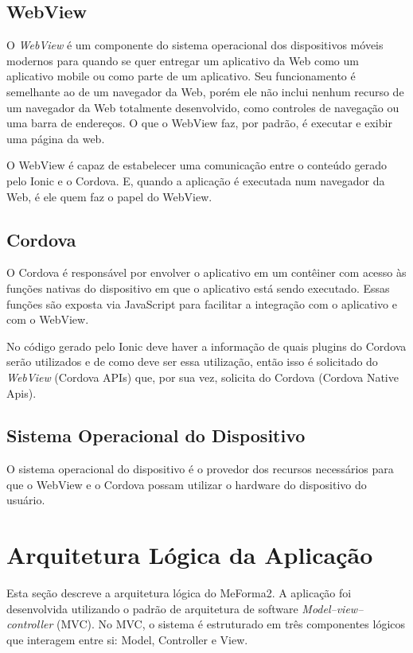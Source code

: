\subsection{WebView}

O \textit{WebView} é um componente do sistema operacional dos dispositivos móveis modernos para quando se quer entregar um aplicativo da Web como um aplicativo mobile ou como parte de um aplicativo. Seu funcionamento é semelhante ao de um navegador da Web, porém ele não inclui nenhum recurso de um navegador da Web totalmente desenvolvido, como controles de navegação ou uma barra de endereços. O que o WebView faz, por padrão, é executar e exibir uma página da web.

O WebView é capaz de estabelecer uma comunicação entre o conteúdo gerado pelo Ionic e o Cordova. E, quando a aplicação é executada num navegador da Web, é ele quem faz o papel do WebView.

\subsection{Cordova}

O Cordova é responsável por envolver o aplicativo em um contêiner com acesso às funções nativas do dispositivo em que o aplicativo está sendo executado. Essas funções são exposta via JavaScript para facilitar a integração com o aplicativo e com o WebView.

No código gerado pelo Ionic deve haver a informação de quais plugins do Cordova serão utilizados e de como deve ser essa utilização, então isso é solicitado do \textit{WebView} (Cordova APIs) que, por sua vez, solicita do Cordova (Cordova Native Apis).

\subsection{Sistema Operacional do Dispositivo}

O sistema operacional do dispositivo é o provedor dos recursos necessários para que o WebView e o Cordova possam utilizar o hardware do dispositivo do usuário.

\section{Arquitetura Lógica da Aplicação}

Esta seção descreve a arquitetura lógica do MeForma2. A aplicação foi desenvolvida utilizando o padrão de arquitetura de software \textit{Model–view–controller} (MVC). No MVC, o sistema é estruturado em três componentes lógicos que interagem entre si: Model, Controller e View.

